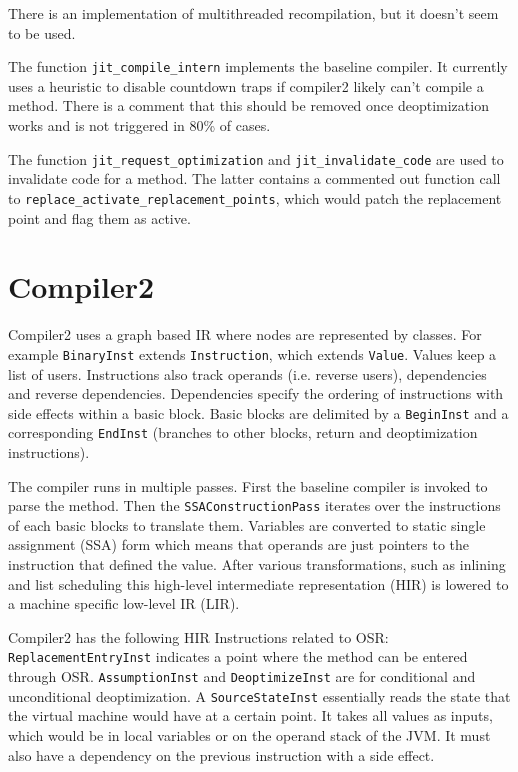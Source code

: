 \documentclass[draft,final]{vutinfth} %
\begin{document}
    There is an implementation of multithreaded recompilation,
    but it doesn't seem to be used.

    The function \lstinline{jit_compile_intern} implements the baseline compiler.
    It currently uses a heuristic to disable countdown traps if compiler2 likely can't compile a method.
    There is a comment that this should be removed once deoptimization works and is not triggered in 80\% of cases.

    The function \lstinline{jit_request_optimization} and \lstinline{jit_invalidate_code} are used to invalidate
    code for a method.
    The latter contains a commented out function call to \linebreak \lstinline{replace_activate_replacement_points},
    which would patch the replacement point and flag them as active.


    \section{Compiler2}

    Compiler2 uses a graph based IR
    where nodes are represented by classes.
    For example \lstinline{BinaryInst} extends \lstinline{Instruction}, which extends \lstinline{Value}.
    Values keep a list of users.
    Instructions also track operands (i.e. reverse users), dependencies and reverse dependencies.
    Dependencies specify the ordering of instructions with side effects within a basic block.
    Basic blocks are delimited by a \lstinline{BeginInst} and a corresponding \lstinline{EndInst} (branches to other blocks, return and deoptimization instructions).

    The compiler runs in multiple passes.
    First the baseline compiler is invoked to parse the method.
    Then the \lstinline{SSAConstructionPass} iterates over the instructions of each basic blocks to translate them.
    Variables are converted to static single assignment (SSA) form which means that operands are just pointers to the
    instruction that defined the value.
    After various transformations, such as inlining and list scheduling this high-level intermediate representation (HIR)
    is lowered to a machine specific low-level IR (LIR).

    Compiler2 has the following HIR Instructions related to OSR:
    \lstinline{ReplacementEntryInst} indicates a point where the method can be entered through OSR.
    \lstinline{AssumptionInst} and \lstinline{DeoptimizeInst} are for conditional and unconditional deoptimization.
    A \lstinline{SourceStateInst} essentially reads the state that the virtual machine would have at a certain point.
    It takes all values as inputs, which would be in local variables or on the operand stack of the JVM.
    It must also have a dependency on the previous instruction with a side effect.
\end{document}
